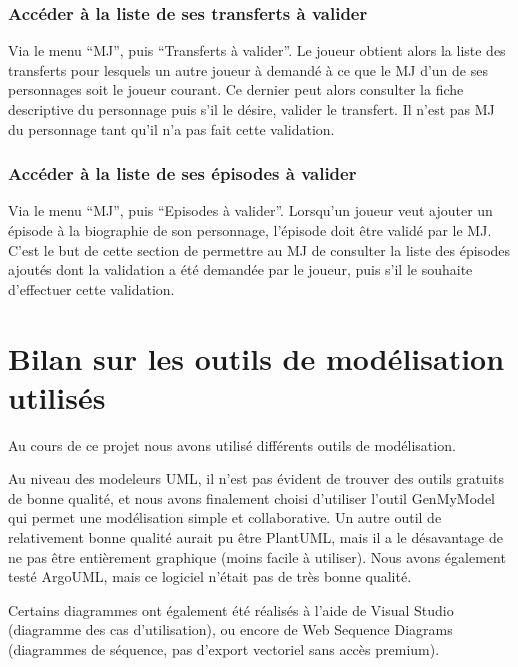 \documentclass[a4paper, 11pt, titlepage]{article}
\begin{document}
\subsubsection {Accéder à la liste de ses transferts à valider}

Via le menu “MJ”, puis “Transferts à valider”. Le joueur obtient alors la liste des transferts pour lesquels un autre joueur à demandé à ce que le MJ d’un de ses personnages soit le joueur courant. Ce dernier peut alors consulter la fiche descriptive du personnage puis s’il le désire, valider le transfert. Il n’est pas MJ du personnage tant qu’il n’a pas fait cette validation.

\subsubsection {Accéder à la liste de ses épisodes à valider}

Via le menu “MJ”, puis “Episodes à valider”. Lorsqu'un joueur veut ajouter un épisode à la biographie de son personnage, l’épisode doit être validé par le MJ. C’est le but de cette section de permettre au MJ de consulter la liste des épisodes ajoutés dont la validation a été demandée par le joueur, puis s’il le souhaite d’effectuer cette validation.




\section {Bilan sur les outils de modélisation utilisés}

Au cours de ce projet nous avons utilisé différents outils de modélisation.

Au niveau des modeleurs UML, il n'est pas évident de trouver des outils gratuits de bonne qualité, et nous avons finalement choisi d'utiliser l'outil GenMyModel qui permet une modélisation simple et collaborative. Un autre outil de relativement bonne qualité aurait pu être PlantUML, mais il a le désavantage de ne pas être entièrement graphique (moins facile à utiliser). Nous avons également testé ArgoUML, mais ce logiciel n'était pas de très bonne qualité.

Certains diagrammes ont également été réalisés à l'aide de Visual Studio (diagramme des cas d'utilisation), ou encore de Web Sequence Diagrams (diagrammes de séquence, pas d'export vectoriel sans accès premium).
\end{document}
